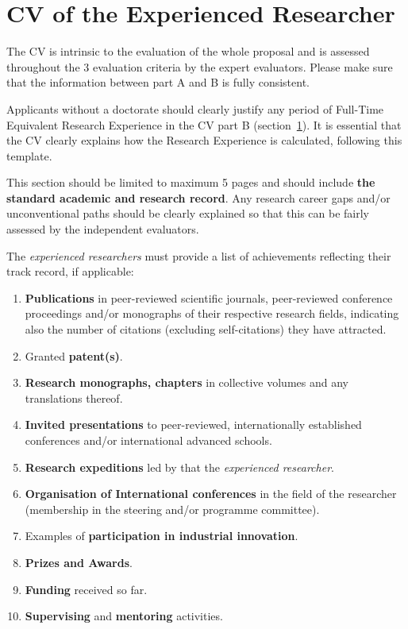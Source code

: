 
\newpage
{}
\section{CV of the Experienced Researcher}
\label{sec:cv}

The CV is intrinsic to the evaluation of the whole proposal and is assessed throughout the 3 evaluation criteria by the expert evaluators.
Please make sure that the information between part A and B is fully consistent.

\medskip\noindent
Applicants without a doctorate should clearly justify any period of Full-Time
Equivalent Research Experience in the CV part B (section~\ref{sec:cv}). It is essential that the
CV clearly explains how the Research Experience is calculated, following this
template.

\medskip\noindent
This section should be limited to maximum 5 pages and should include \textbf{the standard academic and research record}. 
Any research career gaps and/or unconventional paths should be clearly explained so that this can be fairly assessed by the independent evaluators.

\medskip\noindent
The {\em experienced researchers} must provide a list of achievements reflecting their track record, if applicable:

\begin{enumerate}
\item \textbf{Publications} in peer-reviewed scientific journals, peer-reviewed conference proceedings and/or monographs of their respective research fields, indicating also the number of citations (excluding self-citations) they have attracted.
\item Granted \textbf{patent(s)}.
\item \textbf{Research monographs, chapters} in collective volumes and any translations thereof.
\item \textbf{Invited presentations} to peer-reviewed, internationally established conferences and/or international advanced schools.
\item \textbf{Research expeditions} led by that the {\em experienced researcher}. 
\item \textbf{Organisation of International conferences} in the field of the researcher (membership in the steering and/or programme committee).
\item Examples of \textbf{participation in industrial innovation}.
\item \textbf{Prizes and Awards}.
\item \textbf{Funding} received so far.
\item \textbf{Supervising} and \textbf{mentoring} activities.
\end{enumerate}





